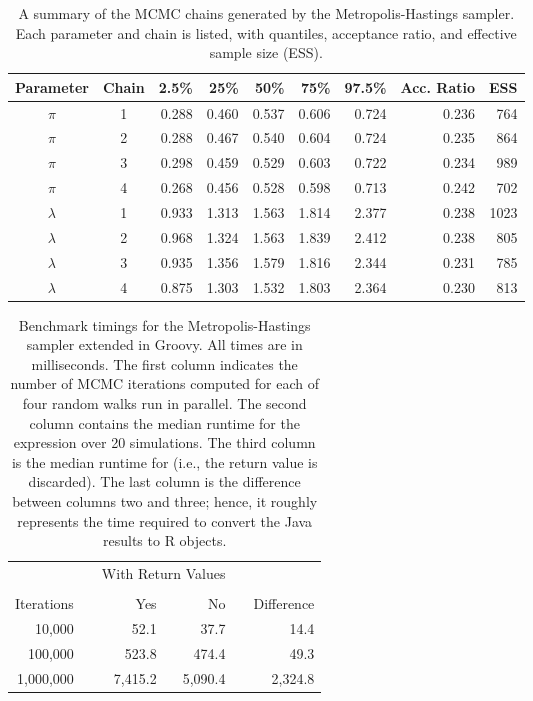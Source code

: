 \begin{table}[h]
\centering
\caption{A summary of the MCMC chains generated by the Metropolis-Hastings sampler. Each parameter and chain is listed, with quantiles, acceptance ratio, and effective sample size (ESS).}
\begin{tabular}{ccrrrrrrr}
\toprule
Parameter & Chain & 2.5\% & 25\% & 50\% & 75\% & 97.5\% & Acc. Ratio & ESS \\ \midrule
$\pi$ &    1 & 0.288 & 0.460 & 0.537 & 0.606 & 0.724 & 0.236 &  764 \\ 
$\pi$ &    2 & 0.288 & 0.467 & 0.540 & 0.604 & 0.724 & 0.235 &  864 \\ 
$\pi$ &    3 & 0.298 & 0.459 & 0.529 & 0.603 & 0.722 & 0.234 &  989 \\ 
$\pi$ &    4 & 0.268 & 0.456 & 0.528 & 0.598 & 0.713 & 0.242 &  702 \\ 
$\lambda$ &    1 & 0.933 & 1.313 & 1.563 & 1.814 & 2.377 & 0.238 & 1023 \\ 
$\lambda$ &    2 & 0.968 & 1.324 & 1.563 & 1.839 & 2.412 & 0.238 &  805 \\ 
$\lambda$ &    3 & 0.935 & 1.356 & 1.579 & 1.816 & 2.344 & 0.231 &  785 \\ 
$\lambda$ &    4 & 0.875 & 1.303 & 1.532 & 1.803 & 2.364 & 0.230 &  813 \\ \bottomrule
\end{tabular}
\label{tab:mcmcx}
\end{table}

\begin{table}[h]
\centering
\caption{Benchmark timings for the Metropolis-Hastings sampler extended in Groovy. All times are in milliseconds. The first column indicates the number of MCMC iterations computed for each of four random walks run in parallel. The second column contains the median runtime for the expression  over 20 simulations. The third column is the median runtime for  (i.e., the return value is discarded). The last column is the difference between columns two and three; hence, it roughly represents the time required to convert the Java results to R objects.}
\begin{tabular}{rrrrrr}
\toprule
& & \multicolumn{2}{c}{With Return Values} & & \\
\cline{3-4} \\[-8pt]
Iterations & & \multicolumn{1}{r}{Yes} & \multicolumn{1}{r}{No} & & Difference \\ \midrule 
10,000 & & 52.1 & 37.7 & & 14.4 \\
100,000 & & 523.8 & 474.4 & & 49.3 \\
1,000,000 & & 7,415.2 & 5,090.4 & & 2,324.8 \\ \bottomrule
\end{tabular}
\label{tab:mcmcgroovy}
\end{table}

